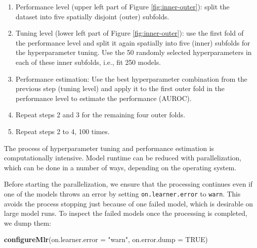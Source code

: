 \documentclass[]{krantz}
\newenvironment{Shaded}{\begin{snugshade}}{\end{snugshade}}
\newcommand{\DataTypeTok}[1]{\textcolor[rgb]{0.27,0.27,0.27}{#1}}
\newcommand{\KeywordTok}[1]{\textcolor[rgb]{0.27,0.27,0.27}{\textbf{#1}}}
\newcommand{\NormalTok}[1]{#1}
\newcommand{\OtherTok}[1]{\textcolor[rgb]{0.37,0.37,0.37}{#1}}
\newcommand{\StringTok}[1]{\textcolor[rgb]{0.5,0.5,0.5}{#1}}
\providecommand{\tightlist}{%
  \setlength{\itemsep}{0pt}\setlength{\parskip}{0pt}}
\begin{document}
\begin{enumerate}
\def\labelenumi{\arabic{enumi}.}
\tightlist
\item
  Performance level (upper left part of Figure \ref{fig:inner-outer}): split the dataset into five spatially disjoint (outer) subfolds.
\item
  Tuning level (lower left part of Figure \ref{fig:inner-outer}): use the first fold of the performance level and split it again spatially into five (inner) subfolds for the hyperparameter tuning.
  Use the 50 randomly selected hyperparameters in each of these inner subfolds, i.e., fit 250 models.
\item
  Performance estimation: Use the best hyperparameter combination from the previous step (tuning level) and apply it to the first outer fold in the performance level to estimate the performance (AUROC).
\item
  Repeat steps 2 and 3 for the remaining four outer folds.
\item
  Repeat steps 2 to 4, 100 times.
\end{enumerate}

The process of hyperparameter tuning and performance estimation is computationally intensive.
Model runtime can be reduced with parallelization, which can be done in a number of ways, depending on the operating system.

Before starting the parallelization, we ensure that the processing continues even if one of the models throws an error by setting \texttt{on.learner.error} to \texttt{warn}.
This avoids the process stopping just because of one failed model, which is desirable on large model runs.
To inspect the failed models once the processing is completed, we dump them:

\begin{Shaded}
\begin{Highlighting}[]
\KeywordTok{configureMlr}\NormalTok{(}\DataTypeTok{on.learner.error =} \StringTok{"warn"}\NormalTok{, }\DataTypeTok{on.error.dump =} \OtherTok{TRUE}\NormalTok{)}
\end{Highlighting}
\end{Shaded}
\end{document}
